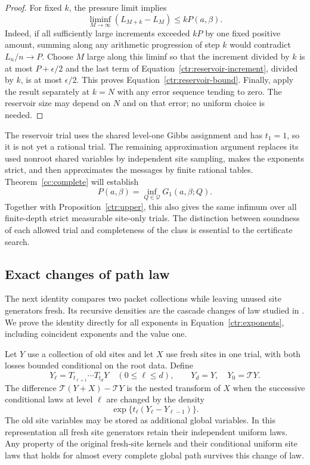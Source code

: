 \begin{proof}
For fixed $k$, the pressure limit implies
\[
 \liminf_{M\to\infty}(L_{M+k}-L_M)\le kP(a,\beta).
\]
Indeed, if all sufficiently large increments exceeded $kP$ by one fixed
positive amount, summing along any arithmetic progression of step $k$
would contradict $L_n/n\to P$.  Choose $M$ large along this liminf so that
the increment divided by $k$ is at most $P+\epsilon/2$ and the last term of
Equation~\eqref{ctr:reservoir-increment}, divided by $k$, is at most
$\epsilon/2$.  This proves Equation~\eqref{ctr:reservoir-bound}.  Finally,
apply the result separately at $k=N$ with any error sequence tending to zero.
The reservoir size may depend on $N$ and on that error; no uniform choice is
needed.
\end{proof}

The reservoir trial uses the shared level-one Gibbs assignment and has
$t_1=1$, so it is not yet a rational trial.  The remaining approximation
argument replaces its used nonroot shared variables by independent site
sampling, makes the exponents strict, and then approximates the messages by
finite rational tables.  Theorem~\ref{cc:complete} will establish
\[
 P(a,\beta)=\inf_{Q\in\mathcal Q}G_1(a,\beta;Q).
\]
Together with Proposition~\ref{ctr:upper}, this also gives the same infimum
over all finite-depth strict measurable site-only trials.  The distinction
between soundness of each allowed trial and completeness of the class is
essential to the certificate search.

\subsection{Exact changes of path law}

The next identity compares two packet collections while leaving unused site
generators fresh.  Its recursive densities are the cascade changes of law
studied in \cite[Section~3]{PanchenkoTalagrand2007}.  We prove the identity
directly for all exponents in Equation~\eqref{ctr:exponents}, including
coincident exponents and the value one.

\begin{lemma}
\label{ctr:posterior}
Let $Y$ use a collection of old sites and let $X$ use fresh sites in one
trial, with both losses bounded conditional on the root data.  Define
\[
 Y_\ell=T_{t_{\ell+1}}\cdots T_{t_d}Y\quad(0\le\ell\le d),
 \qquad Y_d=Y,\quad Y_0=\mathcal TY.
\]
The difference $\mathcal T(Y+X)-\mathcal TY$ is the nested transform of
$X$ when the successive conditional laws at level $\ell$ are changed by
the density
\begin{equation}
 \exp\{t_\ell(Y_\ell-Y_{\ell-1})\}.
 \label{ctr:posterior-density}
\end{equation}
The old site variables may be stored as additional global variables.  In
this representation all fresh site generators retain their independent
uniform laws.  Any property of the original fresh-site kernels and their
conditional uniform site laws that holds for almost every complete global
path survives this change of law.
\end{lemma}

